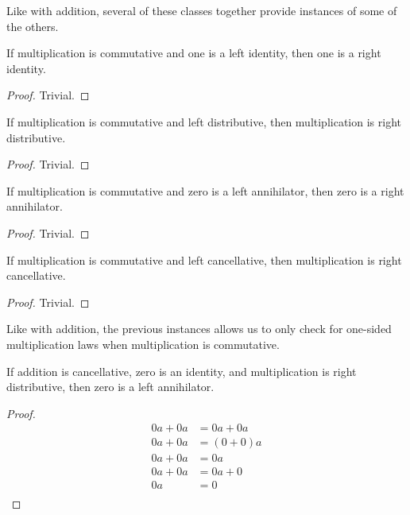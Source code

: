 \documentclass[../../math.tex]{subfiles}
\begin{document}
Like with addition, several of these classes together provide instances of some
of the others.

\begin{instance}
    If multiplication is commutative and one is a left identity, then one is a
    right identity.
\end{instance}
\begin{proof}
    Trivial.
\end{proof}

\begin{instance} \label{ldist_rdist}
    If multiplication is commutative and left distributive, then multiplication
    is right distributive.
\end{instance}
\begin{proof}
    Trivial.
\end{proof}

\begin{instance} \label{mult_lanni_ranni}
    If multiplication is commutative and zero is a left annihilator, then zero
    is a right annihilator.
\end{instance}
\begin{proof}
    Trivial.
\end{proof}

\begin{instance}
    If multiplication is commutative and left cancellative, then multiplication
    is right cancellative.
\end{instance}
\begin{proof}
    Trivial.
\end{proof}

Like with addition, the previous instances allows us to only check for one-sided
multiplication laws when multiplication is commutative.

\begin{instance} \label{ring_mult_lanni}
    If addition is cancellative, zero is an identity, and multiplication is
    right distributive, then zero is a left annihilator.
\end{instance}
\begin{proof}
    \begin{align*}
        0a + 0a &= 0a + 0a \\
        0a + 0a &= (0 + 0)a \\
        0a + 0a &= 0a \\
        0a + 0a &= 0a + 0 \\
        0a &= 0 \\
    \end{align*}
\end{proof}
\end{document}
